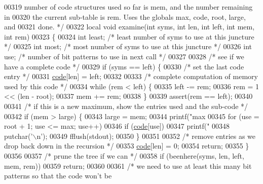 \begin{DoxyCode}
00319 \textcolor{comment}{   number of code structures used so far is mem, and the number remaining in}
00320 \textcolor{comment}{   the current sub-table is rem.  Uses the globals max, code, root, large, and}
00321 \textcolor{comment}{   done. */}
00322 local \textcolor{keywordtype}{void} examine(\textcolor{keywordtype}{int} syms, \textcolor{keywordtype}{int} len, \textcolor{keywordtype}{int} left, \textcolor{keywordtype}{int} mem, \textcolor{keywordtype}{int} rem)
00323 \{
00324     \textcolor{keywordtype}{int} least;          \textcolor{comment}{/* least number of syms to use at this juncture */}
00325     \textcolor{keywordtype}{int} most;           \textcolor{comment}{/* most number of syms to use at this juncture */}
00326     \textcolor{keywordtype}{int} use;            \textcolor{comment}{/* number of bit patterns to use in next call */}
00327 
00328     \textcolor{comment}{/* see if we have a complete code */}
00329     \textcolor{keywordflow}{if} (syms == left) \{
00330         \textcolor{comment}{/* set the last code entry */}
00331         \hyperlink{structcode}{code}[len] = left;
00332 
00333         \textcolor{comment}{/* complete computation of memory used by this code */}
00334         \textcolor{keywordflow}{while} (rem < left) \{
00335             left -= rem;
00336             rem = 1 << (len - root);
00337             mem += rem;
00338         \}
00339         assert(rem == left);
00340 
00341         \textcolor{comment}{/* if this is a new maximum, show the entries used and the sub-code */}
00342         \textcolor{keywordflow}{if} (mem > large) \{
00343             large = mem;
00344             printf(\textcolor{stringliteral}{"max %
00345             \textcolor{keywordflow}{for} (use = root + 1; use <= max; use++)
00346                 \textcolor{keywordflow}{if} (\hyperlink{structcode}{code}[use])
00347                     printf(\textcolor{stringliteral}{"%
00348             putchar(\textcolor{charliteral}{'\(\backslash\)n'});
00349             fflush(stdout);
00350         \}
00351 
00352         \textcolor{comment}{/* remove entries as we drop back down in the recursion */}
00353         \hyperlink{structcode}{code}[len] = 0;
00354         \textcolor{keywordflow}{return};
00355     \}
00356 
00357     \textcolor{comment}{/* prune the tree if we can */}
00358     \textcolor{keywordflow}{if} (beenhere(syms, len, left, mem, rem))
00359         \textcolor{keywordflow}{return};
00360 
00361     \textcolor{comment}{/* we need to use at least this many bit patterns so that the code won't be}
}}
\end{DoxyCode}
